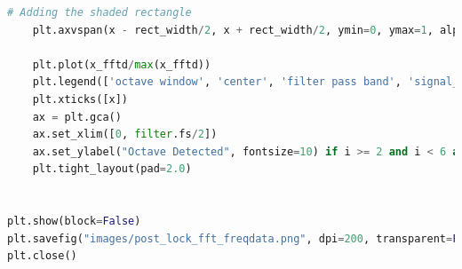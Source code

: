 \documentclass[a4paper, 11pt]{exam}
\begin{document}
\begin{lstlisting}[language=Python]
    # Adding the shaded rectangle
    plt.axvspan(x - rect_width/2, x + rect_width/2, ymin=0, ymax=1, alpha=0.3, color='blue')

    plt.plot(x_fftd/max(x_fftd))
    plt.legend(['octave window', 'center', 'filter pass band', 'signal_fft'], fontsize=10, loc='upper right', bbox_to_anchor=(1, 1)) if i == 1 else None
    plt.xticks([x])
    ax = plt.gca()
    ax.set_xlim([0, filter.fs/2])
    ax.set_ylabel("Octave Detected", fontsize=10) if i >= 2 and i < 6 and i != 3 else ax.set_ylabel(" ", fontsize=10)
    plt.tight_layout(pad=2.0)


plt.show(block=False)
plt.savefig("images/post_lock_fft_freqdata.png", dpi=200, transparent=False)
plt.close()
\end{lstlisting}
\end{document}
